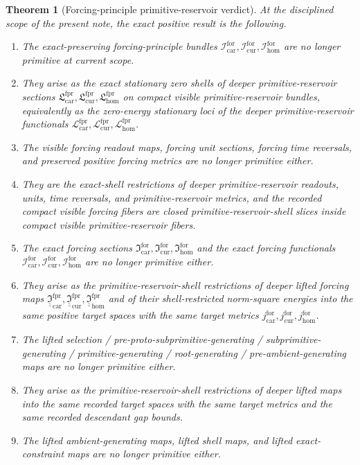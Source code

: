\documentclass[11pt]{article}
\newcommand{\Car}{\mathrm{car}}
\newcommand{\Cur}{\mathrm{cur}}
\newcommand{\Hom}{\mathrm{hom}}
\newcommand{\ForSpace}[1]{\mathcal I_{#1}^{\mathrm{for}}}
\newcommand{\ForTargetMetric}[1]{j_{#1}^{\mathrm{for}}}
\newcommand{\ForSection}[1]{\mathfrak I_{#1}^{\mathrm{for}}}
\newcommand{\ForFunctional}[1]{\mathscr I_{#1}^{\mathrm{for}}}
\newcommand{\ForPrimSection}[1]{\mathfrak L_{#1}^{\mathrm{fpr}}}
\newcommand{\ForPrimFunctional}[1]{\mathscr L_{#1}^{\mathrm{fpr}}}
\newcommand{\ForPrimLiftedForcing}[1]{\underline{\underline{\mathfrak I}}_{#1}^{\mathrm{fpr}}}
\newtheorem{theorem}{Theorem}
\begin{document}
\begin{theorem}[Forcing-principle primitive-reservoir verdict]
\label{thm:verdict}
At the disciplined scope of the present note, the exact positive result is the following.
\begin{enumerate}
    \item The exact-preserving forcing-principle bundles \(\ForSpace{\Car},\ForSpace{\Cur},\ForSpace{\Hom}\) are no longer primitive at current scope.
    \item They arise as the exact stationary zero shells of deeper primitive-reservoir sections \(\ForPrimSection{\Car},\ForPrimSection{\Cur},\ForPrimSection{\Hom}\) on compact visible primitive-reservoir bundles, equivalently as the zero-energy stationary loci of the deeper primitive-reservoir functionals \(\ForPrimFunctional{\Car},\ForPrimFunctional{\Cur},\ForPrimFunctional{\Hom}\).
    \item The visible forcing readout maps, forcing unit sections, forcing time reversals, and preserved positive forcing metrics are no longer primitive either.
    \item They are the exact-shell restrictions of deeper primitive-reservoir readouts, units, time reversals, and primitive-reservoir metrics, and the recorded compact visible forcing fibers are closed primitive-reservoir-shell slices inside compact visible primitive-reservoir fibers.
    \item The exact forcing sections \(\ForSection{\Car},\ForSection{\Cur},\ForSection{\Hom}\) and the exact forcing functionals \(\ForFunctional{\Car},\ForFunctional{\Cur},\ForFunctional{\Hom}\) are no longer primitive either.
    \item They arise as the primitive-reservoir-shell restrictions of deeper lifted forcing maps \(\ForPrimLiftedForcing{\Car},\ForPrimLiftedForcing{\Cur},\ForPrimLiftedForcing{\Hom}\) and of their shell-restricted norm-square energies into the same positive target spaces with the same target metrics \(\ForTargetMetric{\Car},\ForTargetMetric{\Cur},\ForTargetMetric{\Hom}\).
    \item The lifted selection / pre-proto-subprimitive-generating / subprimitive-generating / primitive-generating / root-generating / pre-ambient-generating maps are no longer primitive either.
    \item They arise as the primitive-reservoir-shell restrictions of deeper lifted maps into the same recorded target spaces with the same target metrics and the same recorded descendant gap bounds.
    \item The lifted ambient-generating maps, lifted shell maps, and lifted exact-constraint maps are no longer primitive either.

\end{enumerate}
\end{theorem}
\end{document}

